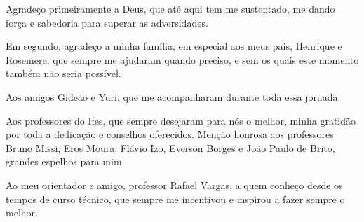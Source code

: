 \begin{agradecimentos}
Agradeço primeiramente a Deus, que até aqui tem me sustentado, me dando força e sabedoria para superar as adversidades.

Em segundo, agradeço a minha família, em especial aos meus pais, Henrique e Rosemere, que sempre me ajudaram quando preciso, e sem os quais este momento também não seria possível.

Aos amigos Gideão e Yuri, que me acompanharam durante toda essa jornada.

Aos professores do Ifes, que sempre desejaram para nós o melhor, minha gratidão por toda a dedicação e conselhos oferecidos. Menção honrosa aos professores Bruno Missi, Eros Moura, Flávio Izo, Everson Borges e João Paulo de Brito, grandes espelhos para mim.

Ao meu orientador e amigo, professor Rafael Vargas, a quem conheço desde os tempos de curso técnico, que sempre me incentivou e inspirou a fazer sempre o melhor.

\end{agradecimentos}